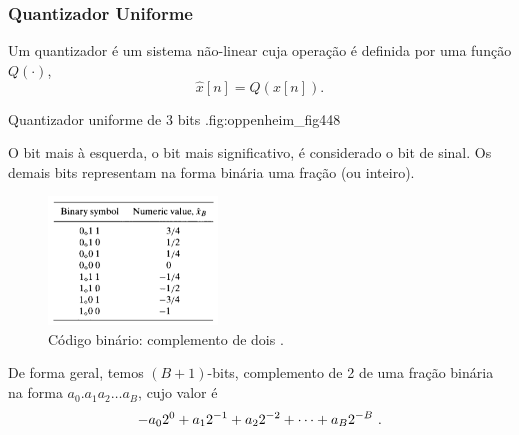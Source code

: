 \begin{frame}[allowframebreaks]
  \frametitle{Quantizador Uniforme}
  Um quantizador é um sistema não-linear cuja operação é definida por uma função $Q(\cdot)$,
  \begin{equation}
  \hat{x}[n] = Q(x[n]) .
  \end{equation}

  \framebreak

  {Quantizador uniforme de 3 bits \citep{oppenheim2009}.}{fig:oppenheim_fig448}



  \framebreak

  O bit mais à esquerda, o bit mais significativo, é considerado o bit de sinal. 
  Os demais bits representam na forma binária uma fração (ou inteiro).
  \begin{figure}[h!]
  \centering
  \includegraphics[width=0.4\textwidth]{images/oppenheim_tab_bincode.png}
  \caption{Código binário: complemento de dois \citep{oppenheim2009}.}
  \label{fig:oppenheim_tab_bincode}
  \end{figure}
  De forma geral, temos $(B+1)$-bits, complemento de 2 de uma fração binária na forma 
  $a_0 . a_1 a_2 \ldots a_B$, cujo valor é
  \begin{equation}
  -a_0 2^0 + a_1 2^{-1} + a_2 2^{-2} + \cdots + a_B 2^{-B} \textmd{ .}
  \end{equation}


\end{frame}
